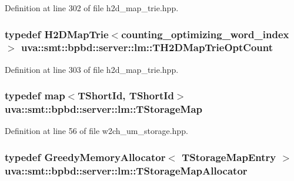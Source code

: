 Definition at line 302 of file h2d\+\_\+map\+\_\+trie.\+hpp.

\hypertarget{namespaceuva_1_1smt_1_1bpbd_1_1server_1_1lm_a3d797c5f90202da4ebb0616a2d9fc188}{}
\subsubsection[{T\+H2\+D\+Map\+Trie\+Opt\+Count}]{\setlength{\rightskip}{0pt plus 5cm}typedef {\bf H2\+D\+Map\+Trie}$<${\bf counting\+\_\+optimizing\+\_\+word\+\_\+index} $>$ {\bf uva\+::smt\+::bpbd\+::server\+::lm\+::\+T\+H2\+D\+Map\+Trie\+Opt\+Count}}\label{namespaceuva_1_1smt_1_1bpbd_1_1server_1_1lm_a3d797c5f90202da4ebb0616a2d9fc188}


Definition at line 303 of file h2d\+\_\+map\+\_\+trie.\+hpp.

\hypertarget{namespaceuva_1_1smt_1_1bpbd_1_1server_1_1lm_a848930f30620014225832ed8d3e6a93e}{}
\subsubsection[{T\+Storage\+Map}]{\setlength{\rightskip}{0pt plus 5cm}typedef map$<${\bf T\+Short\+Id}, {\bf T\+Short\+Id}$>$ {\bf uva\+::smt\+::bpbd\+::server\+::lm\+::\+T\+Storage\+Map}}\label{namespaceuva_1_1smt_1_1bpbd_1_1server_1_1lm_a848930f30620014225832ed8d3e6a93e}


Definition at line 56 of file w2ch\+\_\+um\+\_\+storage.\+hpp.

\hypertarget{namespaceuva_1_1smt_1_1bpbd_1_1server_1_1lm_ab3c8b0f5a97fd6cd90d9fdb8bb2335c1}{}
\subsubsection[{T\+Storage\+Map\+Allocator}]{\setlength{\rightskip}{0pt plus 5cm}typedef {\bf Greedy\+Memory\+Allocator}$<$ {\bf T\+Storage\+Map\+Entry} $>$ {\bf uva\+::smt\+::bpbd\+::server\+::lm\+::\+T\+Storage\+Map\+Allocator}}\label{namespaceuva_1_1smt_1_1bpbd_1_1server_1_1lm_ab3c8b0f5a97fd6cd90d9fdb8bb2335c1}


